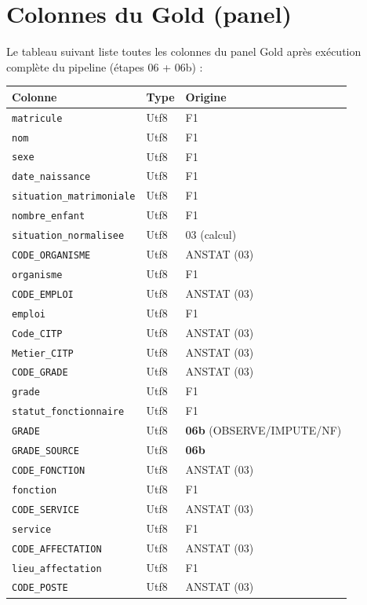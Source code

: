 \documentclass[12pt,a4paper,french]{report}
\begin{document}
\section{Colonnes du Gold (panel)}

Le tableau suivant liste toutes les colonnes du panel Gold après exécution
complète du pipeline (étapes 06 + 06b) :

\begin{longtable}{lll}
  \toprule
  \textbf{Colonne} & \textbf{Type} & \textbf{Origine} \\
  \midrule
  \endhead
  \texttt{matricule} & Utf8 & F1 \\
  \texttt{nom} & Utf8 & F1 \\
  \texttt{sexe} & Utf8 & F1 \\
  \texttt{date\_naissance} & Utf8 & F1 \\
  \texttt{situation\_matrimoniale} & Utf8 & F1 \\
  \texttt{nombre\_enfant} & Utf8 & F1 \\
  \texttt{situation\_normalisee} & Utf8 & 03 (calcul) \\
  \texttt{CODE\_ORGANISME} & Utf8 & ANSTAT (03) \\
  \texttt{organisme} & Utf8 & F1 \\
  \texttt{CODE\_EMPLOI} & Utf8 & ANSTAT (03) \\
  \texttt{emploi} & Utf8 & F1 \\
  \texttt{Code\_CITP} & Utf8 & ANSTAT (03) \\
  \texttt{Metier\_CITP} & Utf8 & ANSTAT (03) \\
  \texttt{CODE\_GRADE} & Utf8 & ANSTAT (03) \\
  \texttt{grade} & Utf8 & F1 \\
  \texttt{statut\_fonctionnaire} & Utf8 & F1 \\
  \texttt{GRADE} & Utf8 & \textbf{06b} (OBSERVE/IMPUTE/NF) \\
  \texttt{GRADE\_SOURCE} & Utf8 & \textbf{06b} \\
  \texttt{CODE\_FONCTION} & Utf8 & ANSTAT (03) \\
  \texttt{fonction} & Utf8 & F1 \\
  \texttt{CODE\_SERVICE} & Utf8 & ANSTAT (03) \\
  \texttt{service} & Utf8 & F1 \\
  \texttt{CODE\_AFFECTATION} & Utf8 & ANSTAT (03) \\
  \texttt{lieu\_affectation} & Utf8 & F1 \\
  \texttt{CODE\_POSTE} & Utf8 & ANSTAT (03) \\

\end{longtable}
\end{document}
